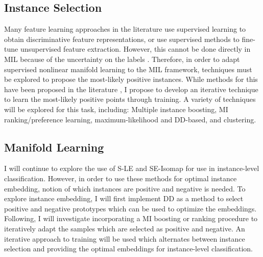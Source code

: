 \subsection{Instance Selection}
Many feature learning approaches in the literature use supervised learning to obtain discriminative feature representations, or use supervised methods to fine-tune unsupervised  feature extraction.  However, this cannot be done directly in MIL because of the uncertainty on the labels \citep{Carbonneau2016MILSurvey}.  Therefore, in order to adapt supervised nonlinear manifold learning to the MIL framework, techniques must be explored to propose the most-likely positive instances.  While methods for this have been proposed in the literature \citep{Kim2010LocalDRMIL, Maron1998DiverseDensity, Bocinsky2019SPIEMIACEInitialization}, I propose to develop an iterative technique to learn the most-likely positive points through training.  A variety of techniques will be explored for this task, including: Multiple instance boosting, MI ranking/preference learning, maximum-likelihood and DD-based, and clustering.  

\subsection{Manifold Learning}
I will continue to explore the use of S-LE and SE-Isomap for use in instance-level classification.  However, in order to use these methods for optimal instance embedding, notion of which instances are positive and negative is needed.  To explore instance  embedding, I will first implement DD as a method to select positive and negative prototypes which can be used to optimize the embeddings.  Following, I will investigate incorporating a MI boosting or ranking procedure to iteratively adapt the samples which are selected as positive and negative.  An iterative approach to training will be used which alternates between instance selection and providing the optimal embeddings for instance-level classification.

